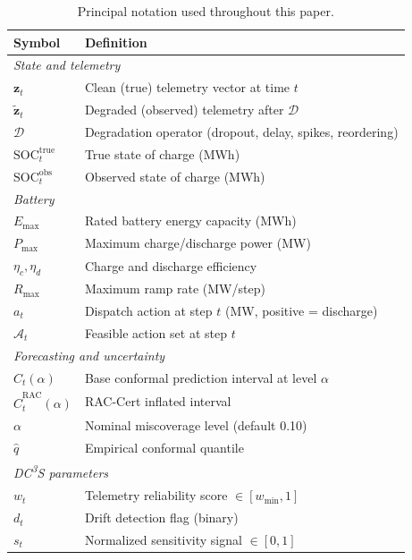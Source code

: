 \documentclass[11pt,a4paper]{article}
\begin{document}
\begin{table}[htbp]
\centering\small
\caption{Principal notation used throughout this paper.}
\label{tab:notation}
\begin{tabular}{p{2.5cm}p{10.0cm}}
\toprule
Symbol & Definition \\
\midrule
\multicolumn{2}{l}{\textit{State and telemetry}} \\
\quad $\mathbf{z}_t$ & Clean (true) telemetry vector at time $t$ \\
\quad $\tilde{\mathbf{z}}_t$ & Degraded (observed) telemetry after $\mathcal{D}$ \\
\quad $\mathcal{D}$ & Degradation operator (dropout, delay, spikes, reordering) \\
\quad $\mathrm{SOC}_t^{\mathrm{true}}$ & True state of charge (MWh) \\
\quad $\mathrm{SOC}_t^{\mathrm{obs}}$ & Observed state of charge (MWh) \\
\midrule
\multicolumn{2}{l}{\textit{Battery}} \\
\quad $E_{\max}$ & Rated battery energy capacity (MWh) \\
\quad $P_{\max}$ & Maximum charge/discharge power (MW) \\
\quad $\eta_c, \eta_d$ & Charge and discharge efficiency \\
\quad $R_{\max}$ & Maximum ramp rate (MW/step) \\
\quad $a_t$ & Dispatch action at step $t$ (MW, positive = discharge) \\
\quad $\mathcal{A}_t$ & Feasible action set at step $t$ \\
\midrule
\multicolumn{2}{l}{\textit{Forecasting and uncertainty}} \\
\quad $\hat{C}_t(\alpha)$ & Base conformal prediction interval at level $\alpha$ \\
\quad $\hat{C}_t^{\mathrm{RAC}}(\alpha)$ & RAC-Cert inflated interval \\
\quad $\alpha$ & Nominal miscoverage level (default 0.10) \\
\quad $\hat{q}$ & Empirical conformal quantile \\
\midrule
\multicolumn{2}{l}{\textit{DC\textsuperscript{3}S parameters}} \\
\quad $w_t$ & Telemetry reliability score $\in [w_{\min}, 1]$ \\
\quad $d_t$ & Drift detection flag (binary) \\
\quad $s_t$ & Normalized sensitivity signal $\in [0, 1]$ \\

\end{tabular}
\end{table}
\end{document}

